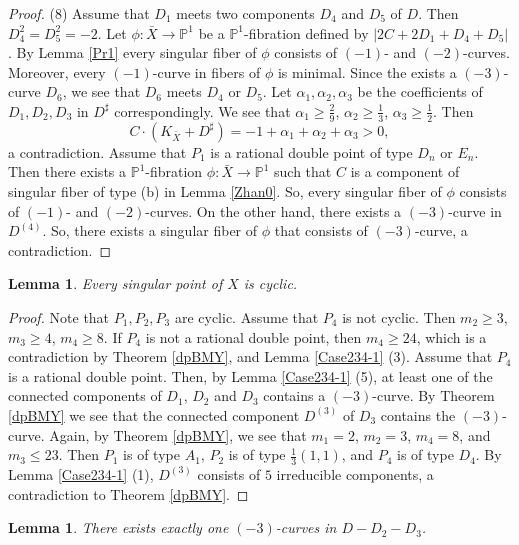 \documentclass[10pt,oneside,reqno]{amsart}
\newcommand{\pp}{\mathbb{P}}
\newtheorem{lemma}[theorem]{Lemma}
\theoremstyle{definition}
\theoremstyle{remark}
\numberwithin{equation}{section}
\begin{document}
\begin{proof}
(8) Assume that $D_1$ meets two components $D_4$ and $D_5$ of $D$. Then $D_4^2=D_5^2=-2$. Let $\phi\colon\bar{X}\rightarrow\pp^1$ be a $\pp^1$-fibration defined by $|2C+2D_1+D_4+D_5|$. By Lemma \ref{Pr1} every singular fiber of $\phi$ consists of $(-1)$- and $(-2)$-curves. Moreover, every $(-1)$-curve in fibers of $\phi$ is minimal. Since the exists a $(-3)$-curve $D_6$, we see that $D_6$ meets $D_4$ or $D_5$. Let $\alpha_1, \alpha_2,\alpha_3$ be the coefficients of $D_1, D_2,D_3$ in $D^{\sharp}$ correspondingly. We see that $\alpha_1\geq\frac{2}{9}$, $\alpha_2\geq\frac{1}{3}$, $\alpha_3\geq\frac{1}{2}$. Then \[C\cdot(K_{\bar{X}}+D^{\sharp})=-1+\alpha_1+\alpha_2+\alpha_3>0,\] a contradiction. Assume that $P_1$ is a rational double point of type $D_n$ or $E_n$. Then there exists a $\pp^1$-fibration $\phi\colon\bar{X}\rightarrow\pp^1$ such that $C$ is a component of singular fiber of type (b) in Lemma \ref{Zhan0}. So, every singular fiber of $\phi$ consists of $(-1)$- and $(-2)$-curves. On the other hand, there exists a $(-3)$-curve in $D^{(4)}$. So, there exists a singular fiber of $\phi$ that consists of $(-3)$-curve, a contradiction.
\end{proof}

\begin{lemma}
\label{Case234-2}
Every singular point of $X$ is cyclic.
\end{lemma}

\begin{proof}
Note that $P_1, P_2, P_3$ are cyclic. Assume that $P_4$ is not cyclic. Then $m_2\geq 3$, $m_3\geq 4$, $m_4\geq 8$. If $P_4$ is not a rational double point, then $m_4 \geq 24$, which is a contradiction by Theorem \ref{dpBMY}, and Lemma \ref{Case234-1} (3). Assume that $P_4$ is a rational double point. Then, by Lemma \ref{Case234-1} (5), at least one of the connected components of $D_1$, $D_2$ and $D_3$ contains a $(-3)$-curve. By Theorem \ref{dpBMY} we see that the connected component $D^{(3)}$ of $D_3$ contains the $(-3)$-curve. Again, by Theorem \ref{dpBMY}, we see that $m_1 = 2$, $m_2 = 3$, $m_4 = 8$, and $m_3 \leq 23$. Then $P_1$ is of type $A_1$, $P_2$ is of type $\frac{1}{3}(1,1)$, and $P_4$ is of type $D_4$. By Lemma \ref{Case234-1} (1), $D^{(3)}$ consists of $5$ irreducible components, a contradiction to Theorem \ref{dpBMY}.
\end{proof}

\begin{lemma}
\label{Case234-3}
There exists exactly one $(-3)$-curves in $D-D_2-D_3$.
\end{lemma}
\end{document}
